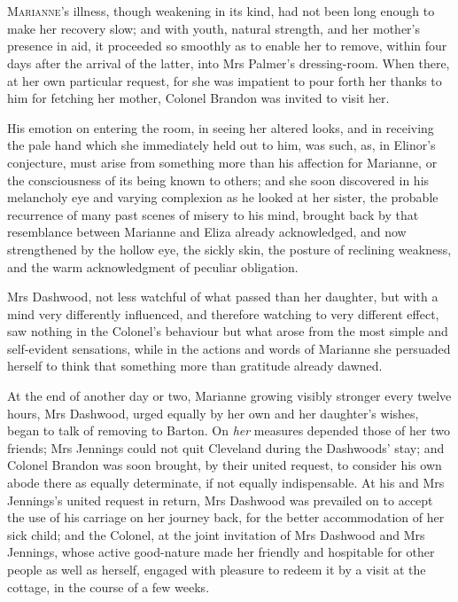 \chapter[Chapter \thechapter]{}
\lettrine[lines=4,lraise=0.3]{M}{arianne}’s illness, though weakening in its kind, had not been long enough to make her recovery slow; and with youth, natural strength, and her mother’s presence in aid, it proceeded so smoothly as to enable her to remove, within four days after the arrival of the latter, into Mrs Palmer’s dressing-room. When there, at her own particular request, for she was impatient to pour forth her thanks to him for fetching her mother, Colonel Brandon was invited to visit her.

His emotion on entering the room, in seeing her altered looks, and in receiving the pale hand which she immediately held out to him, was such, as, in Elinor’s conjecture, must arise from something more than his affection for Marianne, or the consciousness of its being known to others; and she soon discovered in his melancholy eye and varying complexion as he looked at her sister, the probable recurrence of many past scenes of misery to his mind, brought back by that resemblance between Marianne and Eliza already acknowledged, and now strengthened by the hollow eye, the sickly skin, the posture of reclining weakness, and the warm acknowledgment of peculiar obligation.

Mrs Dashwood, not less watchful of what passed than her daughter, but with a mind very differently influenced, and therefore watching to very different effect, saw nothing in the Colonel’s behaviour but what arose from the most simple and self-evident sensations, while in the actions and words of Marianne she persuaded herself to think that something more than gratitude already dawned.

At the end of another day or two, Marianne growing visibly stronger every twelve hours, Mrs Dashwood, urged equally by her own and her daughter’s wishes, began to talk of removing to Barton. On \textit{her} measures depended those of her two friends; Mrs Jennings could not quit Cleveland during the Dashwoods’ stay; and Colonel Brandon was soon brought, by their united request, to consider his own abode there as equally determinate, if not equally indispensable. At his and Mrs Jennings’s united request in return, Mrs Dashwood was prevailed on to accept the use of his carriage on her journey back, for the better accommodation of her sick child; and the Colonel, at the joint invitation of Mrs Dashwood and Mrs Jennings, whose active good-nature made her friendly and hospitable for other people as well as herself, engaged with pleasure to redeem it by a visit at the cottage, in the course of a few weeks.

